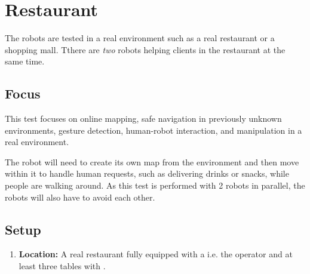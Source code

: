\section{Restaurant}
The robots are tested in a real environment such as a real restaurant or a shopping mall.
Tthere are \emph{two} robots helping clients in the restaurant at the same time.

\subsection{Focus}
This test focuses on online mapping, safe navigation in previously unknown environments, gesture detection, human-robot interaction, and manipulation in a real environment.

The robot will need to create its own map from the environment and then move within it to handle human requests, such as delivering drinks or snacks, while people are walking around.
As this test is performed with 2 robots in parallel, the robots will also have to avoid each other. 

\subsection{Setup}
\begin{enumerate}
	\item \textbf{Location:} A real restaurant fully equipped with a  i.e. the operator and at least three tables with . 
\end{enumerate}

